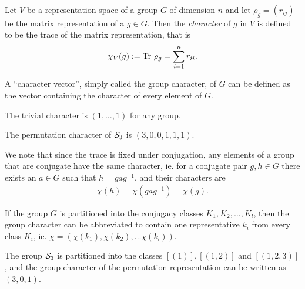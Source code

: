 \begin{definition}
	\begin{definition}\label{def:char}
		Let $V$ be a representation space of a group $G$ of dimension $n$ and let $\rho_g = (r_{ij})$ be the matrix representation of a $g \in G$. Then the \emph{character} of $g$ in $V$ is defined to be the trace of the matrix representation, that is 
		\begin{align*}
			\chi_V(g) := \text{Tr } \rho_g = \sum_{i=1}^{n} r_{ii}.
		\end{align*}
	\end{definition}
\end{definition}

\begin{notation}
	A ``character vector'', simply called the group character, of $G$ can be defined as the vector containing the character of every element of $G$.
\end{notation}

\begin{example}
	The trivial character is $(1, \dots, 1)$ for any group.
\end{example}

\begin{example}
	The permutation character of $\mathcal{S}_3$ is $(3, 0, 0, 1, 1, 1)$.
\end{example}

\begin{remark}
	We note that since the trace is fixed under conjugation, any elements of a group that are conjugate have the same character, ie. for a conjugate pair $g,h \in G$ there exists an $a \in G$ such that $h = gag^{-1}$, and their characters are
	\begin{align*}
		\chi(h) = \chi(gag^{-1}) = \chi(g).
	\end{align*}
\end{remark}

\begin{notation}
	If the group $G$ is partitioned into the conjugacy classes $K_1, K_2, \dots, K_l$, then the group character can be abbreviated to contain one representative $k_i$ from every class $K_i$, ie. $\chi= (\chi(k_1), \chi(k_2), \dots \chi(k_l))$.
\end{notation}

\begin{example}
	The group $\mathcal{S}_3$ is partitioned into the classes $[(1)], [(1,2)]$ and $[(1,2,3)]$, and the group character of the permutation representation can be written as $(3,0,1)$.
\end{example}

